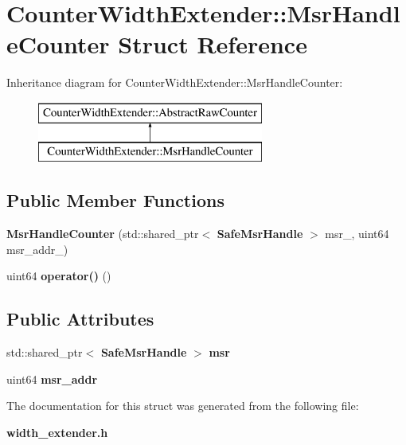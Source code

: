 \section{Counter\+Width\+Extender\+:\+:Msr\+Handle\+Counter Struct Reference}
\label{structCounterWidthExtender_1_1MsrHandleCounter}
Inheritance diagram for Counter\+Width\+Extender\+:\+:Msr\+Handle\+Counter\+:\begin{figure}[H]
\begin{center}
\leavevmode
\includegraphics[height=2.000000cm]{structCounterWidthExtender_1_1MsrHandleCounter}
\end{center}
\end{figure}
\subsection*{Public Member Functions}
\begin{DoxyCompactItemize}
\item 
\mbox{\label{structCounterWidthExtender_1_1MsrHandleCounter_a293eeb777712b8dff89999db5d671bc9}} 
{\bfseries Msr\+Handle\+Counter} (std\+::shared\+\_\+ptr$<$ \textbf{ Safe\+Msr\+Handle} $>$ msr\+\_\+, uint64 msr\+\_\+addr\+\_\+)
\item 
\mbox{\label{structCounterWidthExtender_1_1MsrHandleCounter_af6a1d4c47ab99efc52e87805b20457fc}} 
uint64 {\bfseries operator()} ()
\end{DoxyCompactItemize}
\subsection*{Public Attributes}
\begin{DoxyCompactItemize}
\item 
\mbox{\label{structCounterWidthExtender_1_1MsrHandleCounter_a221afc246d9a2b0d9e902650fe28b9a1}} 
std\+::shared\+\_\+ptr$<$ \textbf{ Safe\+Msr\+Handle} $>$ {\bfseries msr}
\item 
\mbox{\label{structCounterWidthExtender_1_1MsrHandleCounter_a5522d6a788192c2cb69b8d0c4fc0a9a1}} 
uint64 {\bfseries msr\+\_\+addr}
\end{DoxyCompactItemize}


The documentation for this struct was generated from the following file\+:\begin{DoxyCompactItemize}
\item 
\textbf{ width\+\_\+extender.\+h}\end{DoxyCompactItemize}
